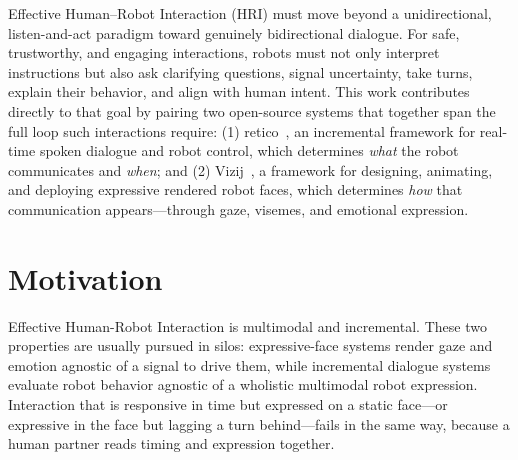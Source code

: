 Effective Human–Robot Interaction (HRI) must move beyond a unidirectional, listen-and-act paradigm toward genuinely bidirectional dialogue. For safe, trustworthy, and engaging interactions, robots must not only interpret instructions but also ask clarifying questions, signal uncertainty, take turns, explain their behavior, and align with human intent. This work contributes directly to that goal by pairing two open-source systems that together span the full loop such interactions require: (1) retico~\cite{michael2020retico}, an incremental framework for real-time spoken dialogue and robot control, which determines \textit{what} the robot communicates and \textit{when}; and (2) Vizij~\cite{elbeleidy2026vizij,elbeleidy2026tutorial}, a framework for designing, animating, and deploying expressive rendered robot faces, which determines \textit{how} that communication appears—through gaze, visemes, and emotional expression.

%
%
%
%
\section{Motivation}

Effective Human-Robot Interaction is multimodal and incremental. These two
properties are usually pursued in silos: expressive-face systems render
gaze and emotion agnostic of a signal to drive them, while
incremental dialogue systems evaluate robot behavior agnostic of a wholistic multimodal robot expression. Interaction that is responsive in time but expressed on a static face---or expressive in the face but lagging a turn behind---fails in the
same way, because a human partner reads timing and expression together. 


